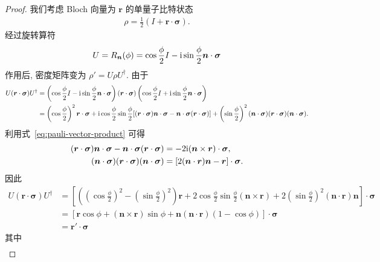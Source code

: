 \documentclass[a4paper]{ctexart}
\begin{document}
\begin{proof}
    我们考虑 Bloch 向量为 $\bm r$ 的单量子比特状态
    \begin{align}
        \rho=\frac{1}{2}\left(I+\bm r\cdot\bm\sigma\right).
    \end{align}
    经过旋转算符
    \begin{align}
        U=R_{\bm n}(\phi)=\cos\frac{\phi}{2}I-\mathrm{i}\sin\frac{\phi}{2}\bm n\cdot\bm\sigma
    \end{align}
    作用后, 密度矩阵变为 $\rho'=U\rho U^\dagger$. 由于
    \begin{align}
        U(\bm r\cdot\bm\sigma)U^\dagger & =\left(\cos\frac{\phi}{2}I-\mathrm{i} \sin\frac{\phi}{2}\bm n\cdot\bm\sigma\right)(\bm r\cdot\bm\sigma)\left(\cos\frac{\phi}{2}I+\mathrm{i} \sin\frac{\phi}{2}\bm n\cdot\bm\sigma\right)                                                                                                            \\
                                        & =\left(\cos\frac{\phi}{2}\right)^2\bm r\cdot\bm\sigma +\mathrm{i} \cos\frac{\phi}{2}\sin\frac{\phi}{2}[(\bm r\cdot\bm\sigma)\bm n\cdot\bm\sigma-\bm n\cdot\bm\sigma(\bm r\cdot\bm\sigma)]+\left(\sin\frac{\phi}{2}\right)^2(\bm n\cdot\bm\sigma)(\bm r\cdot\bm\sigma)(\bm n\cdot\bm\sigma).
    \end{align}
    利用式~\eqref{eq:pauli-vector-product} 可得
    \begin{align}
        (\bm r\cdot\bm\sigma)\bm n\cdot\bm\sigma-\bm n\cdot\bm\sigma(\bm r\cdot\bm\sigma) & =-2\mathrm{i}(\bm n\times\bm r)\cdot\bm\sigma,          \\
        (\bm n\cdot\bm\sigma)(\bm r\cdot\bm\sigma)(\bm n\cdot\bm\sigma)                   & =[2(\bm n\cdot\bm r)\bm n-\bm r]\cdot\bm\sigma.
    \end{align}
    因此
    \begin{align}
        U(\bm r\cdot\bm\sigma)U^\dagger & =\left[\left(\left(\cos\frac{\phi}{2}\right)^2-(\sin\frac{\phi}{2})^2\right)\bm r+2\cos\frac{\phi}{2}\sin\frac{\phi}{2}(\bm n\times\bm r)+2(\sin\frac{\phi}{2})^2(\bm n\cdot\bm r)\bm n\right]\cdot\bm\sigma \\
                                        & =[\bm r\cos\phi+(\bm n\times\bm r)\sin\phi+\bm n(\bm n\cdot\bm r)(1-\cos\phi)]\cdot\bm\sigma                                                                                                                 \\
                                        & =\bm r'\cdot\bm\sigma
    \end{align}
    其中
    \begin{align}\label{eq:bloch-rotation}

\end{align}
\end{proof}
\end{document}
